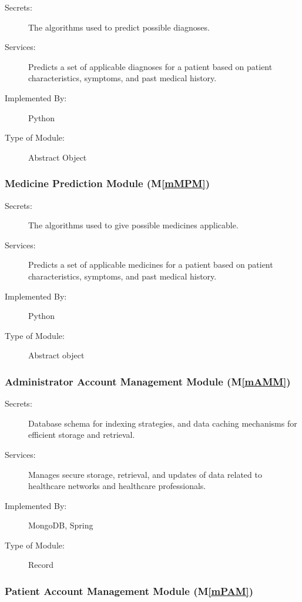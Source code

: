 \documentclass[12pt, titlepage]{article}
\newcommand{\mref}[1]{M\ref{#1}}
\begin{document}
\begin{description}
\item[Secrets:] The algorithms used to predict possible diagnoses.
\item[Services:] Predicts a set of applicable diagnoses for a patient based on patient characteristics, symptoms, and past medical history.
\item[Implemented By:] Python
\item[Type of Module:] Abstract Object
\end{description}

\subsubsection{Medicine Prediction Module (\mref{mMPM})}

\begin{description}
\item[Secrets:] The algorithms used to give possible medicines applicable.
\item[Services:] Predicts a set of applicable medicines for a patient based on patient characteristics, symptoms, and past medical history.
\item[Implemented By:] Python
\item[Type of Module:] Abstract object
\end{description}

\subsubsection{Administrator Account Management Module (\mref{mAMM})}

\begin{description}
\item[Secrets:]Database schema for indexing strategies, and data caching mechanisms for efficient storage and retrieval.
\item[Services:]Manages secure storage, retrieval, and updates of data related to healthcare networks and healthcare professionals.
\item[Implemented By:]MongoDB, Spring
\item[Type of Module:]Record
\end{description}

\subsubsection{Patient Account Management Module (\mref{mPAM})}
\end{document}
